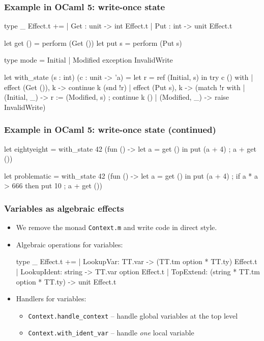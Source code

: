 \documentclass[11pt,aspectratio=169,fleqn]{beamer}
\begin{document}
\begin{frame}[fragile]
  \frametitle{Example in OCaml 5: write-once state}

\footnotesize
\begin{ocamllisting}
type _ Effect.t +=
  | Get : unit -> int Effect.t
  | Put : int -> unit Effect.t

let get () = perform (Get ())
let put s = perform (Put s)

type mode = Initial | Modified
exception InvalidWrite

let with_state (s : int) (c : unit -> 'a) =
  let r = ref (Initial, s) in
  try
    c ()
  with
    | effect (Get ()), k -> continue k (snd !r)
    | effect (Put s), k ->
       (match !r with
        | (Initial, _) -> r := (Modified, s) ; continue k ()
        | (Modified, _) -> raise InvalidWrite)
\end{ocamllisting}
\end{frame}

\begin{frame}[fragile]
  \frametitle{Example in OCaml 5: write-once state (continued)}

\footnotesize
\begin{ocamllisting}
let eightyeight =
  with_state 42
    (fun () ->
      let a = get () in
      put (a + 4) ;
      a + get ())

 let problematic =
  with_state 42
    (fun () ->
      let a = get () in
      put (a + 4) ;
      if a * a > 666 then put 10 ;
      a + get ())
\end{ocamllisting}
\end{frame}

\begin{frame}[fragile]
  \frametitle{Variables as algebraic effects}

  \begin{itemize}
  \item We remove the monad \lstinline{Context.m} and write code in direct style.
  \item Algebraic operations for variables:
{\small
\begin{ocamllisting}
type _ Effect.t +=
 | LookupVar: TT.var -> (TT.tm option * TT.ty) Effect.t
 | LookupIdent: string -> TT.var option Effect.t
 | TopExtend: (string * TT.tm option * TT.ty) -> unit Effect.t
\end{ocamllisting}
}
  \item \pause
    Handlers for variables:
    \begin{itemize}
    \item \lstinline{Context.handle_context} -- handle global variables at the top level
    \item \lstinline{Context.with_ident_var} -- handle \emph{one} local variable
    \end{itemize}
  \end{itemize}
\end{frame}
\end{document}

